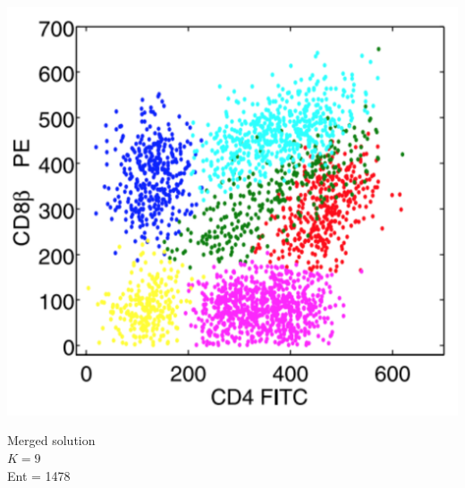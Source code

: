 \documentclass[mathserif,compress]{beamer}
\renewcommand\;{\,}
\begin{document}
\begin{frame}
\begin{center}
\begin{minipage}{0.3\linewidth}
\includegraphics[width=\linewidth]{Combined_positive.png}
\begin{center}
Merged solution
\\
$K = 9$
\\
Ent = 1478
\end{center}
\end{minipage}
\end{center}
\end{frame}
\end{document}

